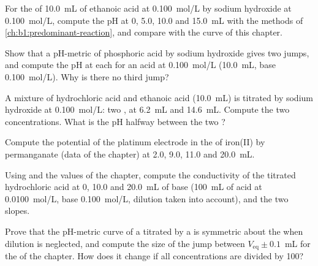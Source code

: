 \begin{exercise}[$\star\star$]\label{exo:b1:titration-methods:5}
For the  of \qty{10.0}{mL} of ethanoic acid at \qty{0.100}{mol/L}
by sodium hydroxide at \qty{0.100}{mol/L}, compute the pH at 0, 5.0, 10.0
and \qty{15.0}{mL} with the methods of \cref{ch:b1:predominant-reaction},
and compare with the curve of this chapter.
\end{exercise}

\begin{exercise}[$\star\star$]\label{exo:b1:titration-methods:6}
Show that a pH-metric  of phosphoric acid by sodium hydroxide
gives two jumps, and compute the pH at each  for an acid at
\qty{0.100}{mol/L} (\qty{10.0}{mL}, base \qty{0.100}{mol/L}). Why is there
no third jump?
\end{exercise}

\begin{exercise}[$\star\star$]\label{exo:b1:titration-methods:7}
A mixture of hydrochloric acid and ethanoic acid (\qty{10.0}{mL}) is
titrated by sodium hydroxide at \qty{0.100}{mol/L}: two , at
\qty{6.2}{mL} and \qty{14.6}{mL}. Compute the two concentrations. What is
the pH halfway between the two ?
\end{exercise}

\begin{exercise}[$\star\star$]\label{exo:b1:titration-methods:8}
Compute the potential of the platinum electrode in the  of
iron(II) by permanganate (data of the chapter) at 2.0, 9.0, 11.0 and
\qty{20.0}{mL}.
\end{exercise}

\begin{exercise}[$\star\star$]\label{exo:b1:titration-methods:9}
Using  and the values of the chapter, compute the
conductivity of the titrated hydrochloric acid at 0, 10.0 and
\qty{20.0}{mL} of base (\qty{100}{mL} of acid at \qty{0.0100}{mol/L}, base
\qty{0.100}{mol/L}, dilution taken into account), and the two slopes.
\end{exercise}

\begin{exercise}[$\star\star\star$]\label{exo:b1:titration-methods:10}
Prove that the pH-metric curve of a  titrated by a 
is symmetric about the  when dilution is neglected,
and compute the size of the jump between $V_{\mathrm{eq}} \pm 0.1$~mL
for the  of the chapter. How does it change if all
concentrations are divided by 100?
\end{exercise}

